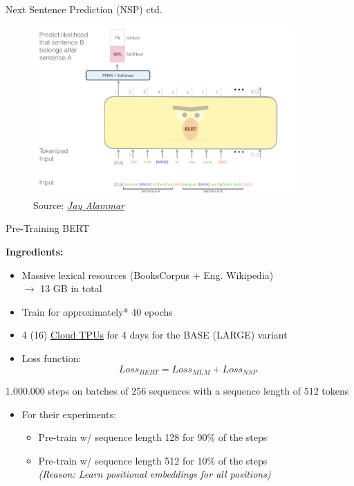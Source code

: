 
\begin{vbframe}{Next Sentence Prediction (NSP) ctd.}

\vfill

	\begin{figure}
		\centering
		\includegraphics[width = 10cm]{figure/bert-nsp.png}\\ 
		\footnotesize{Source:} \href{https://jalammar.github.io/illustrated-bert/}{\footnotesize \it Jay Alammar}
	\end{figure}

\vfill

\end{vbframe}


\begin{frame}{Pre-Training BERT}

\textbf{Ingredients:}

\begin{itemize}
	\item Massive lexical resources (BooksCorpus $+$ Eng. Wikipedia)\\
				$\rightarrow$ 13 GB in total
	\item Train for approximately* 40 epochs
	\item 4 (16) \href{https://cloud.google.com/tpu/}{Cloud TPUs} for 4 days for the BASE (LARGE) variant
	\item Loss function: $$Loss_{BERT} = Loss_{MLM} + Loss_{NSP}$$
\end{itemize}
				\vspace{.3cm}
				{\scriptsize *1.000.000 steps on batches of 256 sequences with a sequence length of 512 tokens}
\begin{itemize}
	\item For their experiments:
		\begin{itemize}
			\item Pre-train w/ sequence length 128 for 90\% of the steps
			\item Pre-train w/ sequence length 512 for 10\% of the steps \\
						\textit{(Reason: Learn positional embeddings for all positions)}
		\end{itemize}
\end{itemize}
\end{frame}


\endlecture

